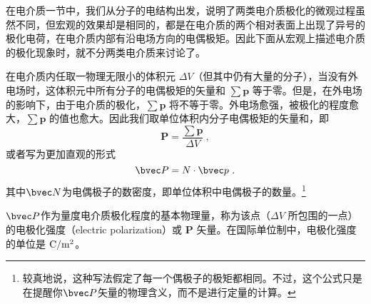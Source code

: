 
\begin{issues}
\end{issues}


在电介质一节中，我们从分子的电结构出发，说明了两类电介质极化的微观过程虽然不同，但宏观的效果却是相同的，都是在电介质的两个相对表面上出现了异号的极化电荷，在电介质内部有沿电场方向的电偶极矩。因此下面从宏观上描述电介质的极化现象时，就不分两类电介质来讨论了。

在电介质内任取一物理无限小的体积元 $\Delta V$（但其中仍有大量的分子），当没有外电场时，这体积元中所有分子的电偶极矩的矢量和 $\sum \mathbf p$ 等于零。但是，在外电场的影响下，由于电介质的极化，$\sum \mathbf p$ 将不等于零。外电场愈强，被极化的程度愈大，$\sum \mathbf p$ 的值也愈大。因此我们取单位体积内分子电偶极矩的矢量和，即
\begin{equation}
\mathbf P=\frac{\sum \mathbf p}{\Delta V} ~,
\end{equation}
或者写为更加直观的形式
\begin{equation}
\bvec P = N \cdot \bvec p~.
\end{equation}
其中$\bvec N$为电偶极子的数密度，即单位体积中电偶极子的数量。\footnote{较真地说，这种写法假定了每一个偶极子的极矩都相同。不过，这个公式只是在提醒你$\bvec P$矢量的物理含义，而不是进行定量的计算。}

$\bvec P$作为量度电介质极化程度的基本物理量，称为该点（$\Delta V$ 所包围的一点）的电极化强度（electric polarization）或 $\mathbf P$ 矢量。在国际单位制中，电极化强度的单位是 $\rm C/m^2$。
